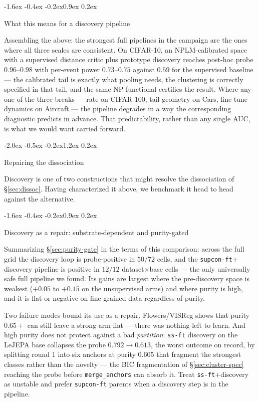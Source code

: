 \documentclass{article}
\makeatletter
\renewcommand\section{\@startsection{section}{1}{\z@}%
  {-2.0ex \@plus -0.5ex \@minus -0.2ex}{1.2ex \@plus 0.2ex}%
  {\large\bf\raggedright}}
\renewcommand\subsection{\@startsection{subsection}{2}{\z@}%
  {-1.6ex \@plus -0.4ex \@minus -0.2ex}{0.9ex \@plus 0.2ex}%
  {\normalsize\bf\raggedright}}
\makeatother
\begin{document}
\subsection{What this means for a discovery pipeline}

Assembling the above: the strongest full pipelines in the campaign are the ones
where all three scales are consistent. On CIFAR-10, an NPLM-calibrated space
with a supervised distance critic plus prototype discovery reaches post-hoc
probe $0.96$--$0.98$ with per-event power $0.73$--$0.75$ against $0.59$ for the
supervised baseline --- the calibrated tail is exactly what pooling needs, the
clustering is correctly specified in that tail, and the same NP functional
certifies the result. Where any one of the three breaks --- rate on CIFAR-100,
tail geometry on Cars, fine-tune dynamics on Aircraft --- the pipeline degrades
in a way the corresponding diagnostic predicts in advance. That predictability,
rather than any single AUC, is what we would want carried forward.

\section{Repairing the dissociation}
\label{sec:repair}

Discovery is one of two constructions that might resolve the dissociation of
\S\ref{sec:dissoc}. Having characterized it above, we benchmark it head to
head against the alternative.

\subsection{Discovery as a repair: substrate-dependent and purity-gated}

Summarizing \S\ref{sec:purity-gate} in the terms of this comparison: across the
full grid the discovery loop is probe-positive in $50/72$ cells, and the
\texttt{supcon-ft}$+$discovery pipeline is positive in $12/12$
dataset$\times$base cells --- the only universally safe full pipeline we found.
Its gains are largest where the pre-discovery space is weakest
($+0.05$ to $+0.15$ on the unsupervised arms) and where purity is high, and it
is flat or negative on fine-grained data regardless of purity.

Two failure modes bound its use as a repair. Flowers/VISReg shows that purity
$0.65+$ can still leave a strong arm flat --- there was nothing left to learn.
And high purity does not protect against a bad \emph{partition}: \texttt{ss-ft}
discovery on the LeJEPA base collapses the probe $0.792\to0.613$, the worst
outcome on record, by splitting round 1 into six anchors at purity $0.605$ that
fragment the strongest classes rather than the novelty --- the BIC
fragmentation of \S\ref{sec:cluster-spec} reaching the probe before
\texttt{merge\_anchors} can absorb it. Treat \texttt{ss-ft}$+$discovery as
unstable and prefer \texttt{supcon-ft} parents when a discovery step is in the
pipeline.
\end{document}
